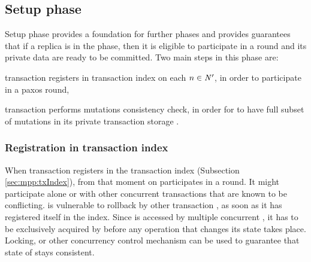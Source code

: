 \subsection{Setup phase}
Setup phase provides a foundation for further phases and provides guarantees that if a replica is in the phase, then it is eligible to participate in a \paxos round and its private data are ready to be committed. Two main steps in this phase are: \begin{enumerate*}[label=\alph*)]
\item transaction \transaction registers in transaction index \txIndex on each $n\in \text{$\mathit{N'}$}$, in order to participate in a paxos round,
\item transaction \transaction performs mutations consistency check, in order for  to have full subset of mutations \mutations in its private transaction storage \txStorage.
\end{enumerate*}


\subsubsection{Registration in transaction index}
When transaction \transaction registers in the transaction index \txIndex (Subsection \ref{sec:mpp:txIndex}), from that moment on \transaction participates in a \paxos round.
It might participate alone or with other concurrent transactions that are known to be conflicting. 
\transaction is vulnerable to rollback by other transaction \transactionj, as soon as it has registered itself in the index.
Since \txIndex is accessed by multiple concurrent \transactions, it has to be exclusively acquired by \transaction before any operation that changes its state takes place. 
Locking, or other concurrency control mechanism can be used to guarantee that state of \txIndex stays consistent.


        
